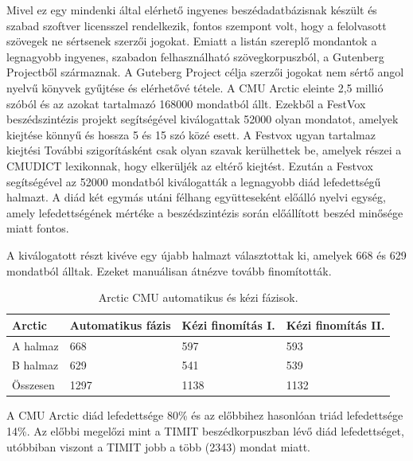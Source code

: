 Mivel ez egy mindenki által elérhető ingyenes beszédadatbázisnak készült és szabad szoftver licensszel rendelkezik, fontos szempont volt, hogy a felolvasott szövegek ne sértsenek szerzői jogokat. Emiatt a listán szereplő mondantok a legnagyobb ingyenes, szabadon felhasználható szövegkorpuszból, a Gutenberg Projectből származnak. A Guteberg Project célja szerzői jogokat nem sértő angol nyelvű könyvek gyűjtése és elérhetővé tétele.
\newline
\newline
A CMU Arctic eleinte 2,5 millió szóból és az azokat tartalmazó 168000 mondatból állt. Ezekből a FestVox beszédszintézis projekt segítségével kiválogattak 52000 olyan mondatot, amelyek kiejtése könnyű és hossza 5 és 15 szó közé esett. A Festvox ugyan tartalmaz kiejtési További szigorításként csak olyan szavak kerülhettek be, amelyek részei a CMUDICT lexikonnak, hogy elkerüljék az eltérő kiejtést.
\newline
\newline
Ezután a Festvox segítségével az 52000 mondatból kiválogatták a legnagyobb diád lefedettségű halmazt. A diád két egymás utáni félhang együtteseként előálló nyelvi egység, amely lefedettségének mértéke a beszédszintézis során előállított beszéd minősége miatt fontos. 

A kiválogatott részt kivéve egy újabb halmazt választottak ki, amelyek 668 és 629 mondatból álltak. Ezeket manuálisan átnézve tovább finomították.

\begin{table}[!ht]
	\begin{tabular}{*4l} \toprule
		\bfseries Arctic & \bfseries Automatikus fázis & \bfseries Kézi finomítás I. & \bfseries Kézi finomítás II. \\ \midrule
		A halmaz                             & 668      & 597   & 593          \\
		\rowcolor{gray!10} 
		B halmaz                             & 629      & 541   & 539        \\
		Összesen                             & 1297      & 1138   & 1132        \\
		\bottomrule
		\hline
	\end{tabular}
	\centering
	\caption{Arctic CMU automatikus és kézi fázisok.}
	\label{fig:arctic-phases}
\end{table}

A CMU Arctic diád lefedettsége 80\% és az előbbihez hasonlóan triád lefedettsége 14\%. Az előbbi megelőzi mint a TIMIT beszédkorpuszban lévő diád lefedettséget, utóbbiban viszont a TIMIT jobb a több (2343) mondat miatt.

